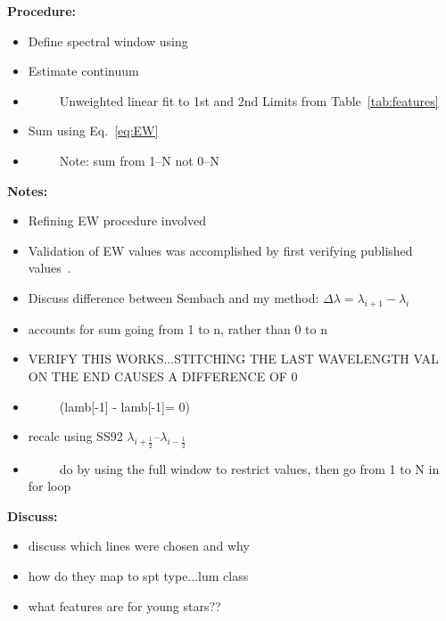 




{\bf Procedure:}\\
\begin{itemize}
	\item{} Define spectral window using
	\item{} Estimate continuum
	\item{}~~~~~Unweighted linear fit to 1st and 2nd Limits from Table~\ref{tab:features}
	\item{} Sum using Eq.~\ref{eq:EW}
	\item{}~~~~~Note: sum from 1--N not 0--N
\end{itemize}


{\bf Notes:}\\
\begin{itemize}
	\item{} Refining EW procedure involved
	\item{} Validation of EW values was accomplished by first verifying published values~\cite{Rayner_2009}.
	\item{} Discuss difference between Sembach and my method: $\Delta\lambda = \lambda_{i+1} - \lambda_{i}$
	\item{} accounts for sum going from 1 to n, rather than 0 to n
	\item{} VERIFY THIS WORKS...STITCHING THE LAST WAVELENGTH VAL ON THE END CAUSES A DIFFERENCE OF 0
	\item{}~~~~~(lamb[-1] - lamb[-1]= 0)
	\item{} recalc using SS92 $\lambda_{i+\frac{1}{2}}$--$\lambda_{i-\frac{1}{2}}$
	\item{}~~~~~do by using the full window to restrict values, then go from 1 to N in for loop
\end{itemize}




{\bf Discuss:}\\
\begin{itemize}
	\item{} discuss which lines were chosen and why
	\item{} how do they map to spt type...lum class
	\item{} what features are for young stars??
\end{itemize}



